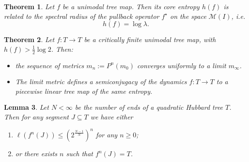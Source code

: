 \documentclass[11pt]{amsart}
\newtheorem{theorem}{Theorem}[section]
\newtheorem{lemma}[theorem]{Lemma}
\begin{document}



\begin{theorem}
Let $f$ be a unimodal tree map. Then its \emph{core entropy} $h(f)$ is related to the spectral radius 
of the pullback operator $f^\star$ on the space $\mathcal{M}(I)$, 
i.e.
$$h(f) = \log \lambda.$$
\end{theorem}


\begin{theorem}
Let $f : T \to T$ be a critically finite unimodal tree map,   
with $h(f) > \frac{1}{2} \log 2$.
Then:
\begin{itemize}
 \item
the sequence of metrics $m_n := P^n(m_0)$ \emph{converges uniformly} to a limit $m_\infty$. 
\item
  The limit metric defines a \emph{semiconjugacy} of the dynamics $f : T \to T$ to a piecewise linear tree map of the same entropy.
\end{itemize}
\end{theorem}


\begin{lemma}
Let $N < \infty$ be the number of ends of a quadratic Hubbard tree $T$. Then for any segment $J \subseteq T$ we have either 
\begin{enumerate}
\item
$\ell(f^n(J)) \leq \left( 2^{\frac{N-1}{N}} \right)^n$ for any $n \geq 0$; 
\item
or there exists $n$ such that $f^n(J) = T$. 
\end{enumerate}
\end{lemma}
\end{document}
